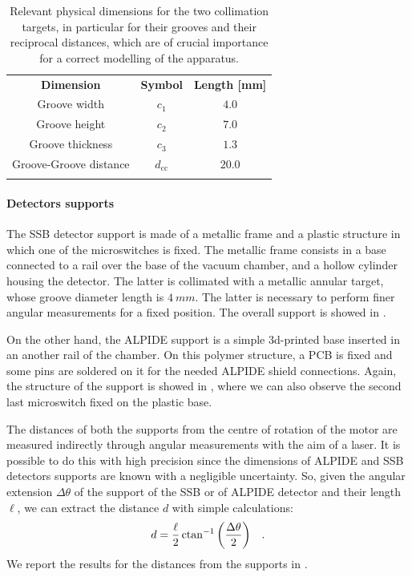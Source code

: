 \documentclass[../../main/main.tex]{subfiles}
\begin{document}
\begin{table}[h]
    \centering
    \begin{tabular}{ccc}
        \toprule
        \textbf{Dimension}  &   \textbf{Symbol} &   \textbf{Length [mm]} \\
        \colrule
        Groove width    &   \( c_{1} \) &   \( 4.0 \)   \\
        Groove height    &   \( c_{2} \) &   \( 7.0 \)   \\
        Groove thickness    &   \( c_{3} \) &   \( 1.3 \)   \\
        Groove-Groove distance  &   \( d_{\mathrm{cc}} \) &   \( 20.0 \)   \\
        \botrule
    \end{tabular}
    \caption{Relevant physical dimensions for the two collimation targets, in particular for their grooves and their reciprocal distances, which are of crucial importance for a correct modelling of the apparatus.}
    \label{tab:mechanics_collimator_dimensions}
\end{table}


\paragraph{Detectors supports}
The SSB detector support is made of a metallic frame and a plastic structure in which one of the microswitches is fixed. The metallic frame consists in a base connected to a rail over the base of the vacuum chamber, and a hollow cylinder housing the detector. The latter is collimated with a metallic annular target, whose groove diameter length is \( 4 \ \si{mm} \). The latter is necessary to perform finer angular measurements for a fixed position. The overall support is showed in .

On the other hand, the ALPIDE support is a simple 3d-printed base inserted in an another rail of the chamber. On this polymer structure, a PCB is fixed and some pins are soldered on it for the needed ALPIDE shield connections. Again, the structure of the support is showed in , where we can also observe the second last microswitch fixed on the plastic base.

The distances of both the supports from the centre of rotation of the motor are measured indirectly through angular measurements with the aim of a laser. It is possible to do this with high precision since the dimensions of ALPIDE and SSB detectors supports are known with a negligible uncertainty. So, given the angular extension \( \Delta \theta \) of the support of the SSB or of ALPIDE detector and their length \( \ell \), we can extract the distance \( d \) with simple calculations:
\begin{equation}
    d
    =
    \frac{\ell}{2} \operatorname{ctan}^{-1}\qty(\frac{\Delta \theta}{2})
    \quad .
\end{equation}
We report the results for the distances from the supports in .
\end{document}
